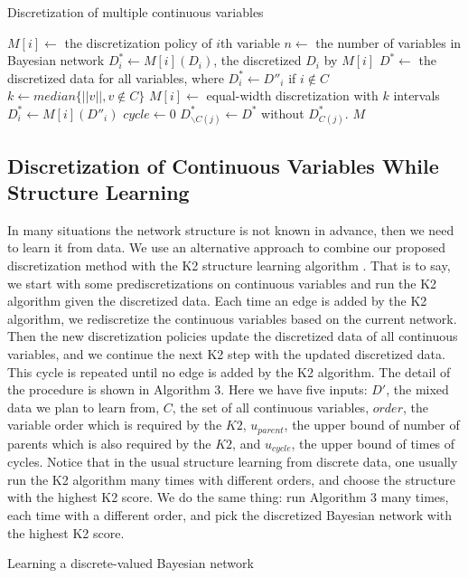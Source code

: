 {\begin{algorithm}
\caption{ Discretization of multiple continuous variables}
\begin{algorithmic}[5]
\State
\State $M[i] \leftarrow$ the discretization policy of $i$th variable
\State $n \leftarrow$ the number of variables in Bayesian network
\State $D^*_i \leftarrow M[i] (D_i)$, the discretized $D_i$ by $M[i]$
\State $D^* \leftarrow $ the discretized data for all variables, where $D^*_i \leftarrow D''_i$ if $i \notin C$
\State $k \leftarrow median\{ ||v||, v\notin C\}$
\State
{}
\State $M[i] \leftarrow$  equal-width discretization with $k$ intervals
\State $D^*_i \leftarrow  M[i] (D''_i)$
\EndIf
\EndFor
\State
\State $cycle \leftarrow 0$
\State $D^*_{\backslash C(j)} \leftarrow D^*$ without $D^*_{C(j)}$.
\EndFor
\EndWhile
\State \Return $M$
\EndFunction
\end{algorithmic}
\end{algorithm}

\subsection{Discretization of Continuous Variables While Structure Learning}
\label{SL}
In many situations the network structure is not known in advance, then we need to learn it from data. We use an alternative approach to combine our proposed discretization method with the K2 structure learning algorithm \citep{K2}. That is to say, we start with some prediscretizations on continuous variables and run the K2 algorithm given the discretized data. Each time an edge is added by the K2 algorithm, we rediscretize the continuous variables based on the current network. Then the new discretization policies update the discretized data of all continuous variables, and we continue the next K2 step with the updated discretized data. This cycle is repeated until no edge is added by the K2 algorithm. The detail of the procedure is shown in Algorithm 3. Here we have five inputs: $D'$, the mixed data we plan to learn from, $C$, the set of all continuous variables, $order$, the variable order which is required by the $K2$, $u_{parent}$, the upper bound of number of parents which is also required by the $K2$, and $u_{cycle}$, the upper bound of times of cycles. Notice that in the usual structure learning from discrete data, one usually run the K2 algorithm many times with different orders, and choose the structure with the highest K2 score. We do the same thing: run Algorithm 3 many times, each time with a different order, and pick the discretized Bayesian network with the highest K2 score.
\begin{algorithm}
\caption{ Learning a discrete-valued Bayesian network}
\begin{algorithmic}[5]
\State


\end{algorithmic}
\end{algorithm}}
